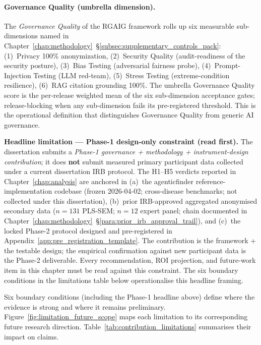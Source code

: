 \paragraph{Governance Quality (umbrella dimension).}
The \emph{Governance Quality} of the RGAIG framework rolls up six measurable sub-dimensions named in Chapter~\ref{chap:methodology}~§\ref{subsec:supplementary_controls_pack}: (1)~Privacy 100\% anonymization, (2)~Security Quality (audit-readiness of the security posture), (3)~Bias Testing (adversarial fairness probe), (4)~Prompt-Injection Testing (LLM red-team), (5)~Stress Testing (extreme-condition resilience), (6)~RAG citation grounding 100\%. The umbrella Governance Quality score is the per-release weighted mean of the six sub-dimension acceptance gates; release-blocking when any sub-dimension fails its pre-registered threshold. This is the operational definition that distinguishes Governance Quality from generic AI governance.

\noindent\textbf{Headline limitation — Phase-1 design-only constraint (read first).} The dissertation submits a \emph{Phase-1 governance + methodology + instrument-design contribution}; it does \textbf{not} submit measured primary participant data collected under a current dissertation IRB protocol. The H1--H5 verdicts reported in Chapter~\ref{chap:analysis} are anchored in (a)~the agenticfinder reference-implementation codebase (frozen 2026-04-02; cross-disease benchmarks; not collected under this dissertation), (b)~prior IRB-approved aggregated anonymised secondary data ($n=131$ PLS-SEM; $n=12$ expert panel; chain documented in Chapter~\ref{chap:methodology}~§\ref{para:prior_irb_approval_trail}), and (c)~the locked Phase-2 protocol designed and pre-registered in Appendix~\ref{app:pre_registration_template}. The contribution is the framework + the testable design; the empirical confirmation against new participant data is the Phase-2 deliverable. Every recommendation, ROI projection, and future-work item in this chapter must be read against this constraint. The six boundary conditions in the limitations table below operationalise this headline framing.

Six boundary conditions (including the Phase-1 headline above) define where the evidence is strong and where it remains preliminary. Figure~\ref{fig:limitation_future_scope} maps each limitation to its corresponding future research direction. Table~\ref{tab:contribution_limitations} summarises their impact on claims.



